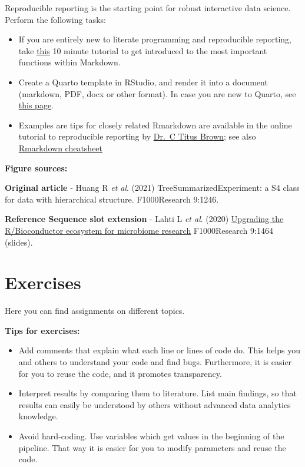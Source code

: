 \documentclass[
]{book}
\providecommand{\tightlist}{%
  \setlength{\itemsep}{0pt}\setlength{\parskip}{0pt}}
\begin{document}
Reproducible reporting is the starting point for robust interactive
data science. Perform the following tasks:

\begin{itemize}
\item
  If you are entirely new to literate programming and reproducible
  reporting, take \href{https://www.markdowntutorial.com/}{this} 10 minute
  tutorial to get introduced to the most important functions within
  Markdown.
\item
  Create a Quarto template in RStudio, and render it into a
  document (markdown, PDF, docx or other format). In case you are new
  to Quarto, see \href{https://quarto.org/}{this page}.
\item
  Examples are tips for closely related Rmarkdown are available in
  the online tutorial to reproducible reporting by \href{https://rpubs.com/marschmi/RMarkdown}{Dr.~C Titus
  Brown}; see also \href{https://www.rstudio.com/wp-content/uploads/2015/02/rmarkdown-cheatsheet.pdf}{Rmarkdown
  cheatsheet}
\end{itemize}

\textbf{Figure sources:}

\textbf{Original article}
- Huang R \emph{et al}. (2021) TreeSummarizedExperiment: a S4 class
for data with hierarchical structure. F1000Research 9:1246. \citep{Huang2021}

\textbf{Reference Sequence slot extension}
- Lahti L \emph{et al}. (2020) \href{https://doi.org/10.7490/\%20f1000research.1118447.1}{Upgrading the R/Bioconductor ecosystem for microbiome
research} F1000Research 9:1464 (slides).

\hypertarget{exercises}{%
\chapter{Exercises}\label{exercises}}

Here you can find assignments on different topics.

\textbf{Tips for exercises:}

\begin{itemize}
\tightlist
\item
  Add comments that explain what each line or lines of code do. This helps you and others to understand your code and find bugs. Furthermore, it is easier for you to reuse the code, and it promotes transparency.
\item
  Interpret results by comparing them to literature. List main findings, so that results can easily be understood by others without advanced data analytics knowledge.
\item
  Avoid hard-coding. Use variables which get values in the beginning of the pipeline. That way it is easier for you to modify parameters and reuse the code.
\end{itemize}
\end{document}
